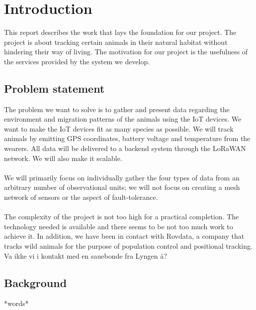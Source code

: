 \tableofcontents
\listoffigures

\clearpage

\section{Introduction}
	This report describes the work that lays the foundation for our project. The project is about tracking certain animals in their natural habitat without hindering their way of living. The motivation for our project is the usefulness of the services provided by the system we develop. 
	\subsection{Problem statement}
		The problem we want to solve is to gather and present data regarding the environment and migration patterns of the animals using the IoT devices. We want to make the IoT devices fit as many species as possible. We will track animals by emitting GPS coordinates, battery voltage and temperature from the wearers. All data will be delivered to a backend system through the LoRaWAN network. We will also make it scalable. 
		\\\\
		We will primarily focus on individually gather the four types of data from an arbitrary number of observational units; we will not focus on creating a mesh network of sensors or the aspect of fault-tolerance. 
		\\\\
		The complexity of the project is not too high for a practical completion. The technology needed is available and there seems to be not too much work to achieve it. In addition, we have been in contact with Rovdata, a company that tracks wild animals for the purpose of population control and positional tracking. Va ikke vi i kontakt med en sauebonde fra Lyngen å? 
	\subsection{Background}
		*words*
		
